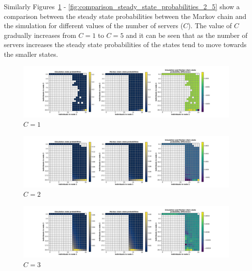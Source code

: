 Similarly Figures~\ref{fig:comparison_steady_state_probabilities_2_1} -
\ref{fig:comparison_steady_state_probabilities_2_5} show a comparison between
the steady state probabilities between the Markov chain and the simulation
for different values of the number of servers (\(C\)).
The value of \(C\) gradually increases from \(C = 1\) to \(C = 5\) and it can
be seen that as the number of servers increases the steady state probabilities
of the states tend to move towards the smaller states.


\begin{figure}[H]
    \includegraphics[width=\textwidth, trim=100 10 100 10, clip]{chapters/03_queueing_model/img/numeric_results_and_timings/steady_state_probabilities_2/main_1.pdf}
    \caption{\(C = 1\)}
    \label{fig:comparison_steady_state_probabilities_2_1}
\end{figure}

\begin{figure}[H]
    \includegraphics[width=\textwidth, trim=100 10 100 10, clip]{chapters/03_queueing_model/img/numeric_results_and_timings/steady_state_probabilities_2/main_2.pdf}
    \caption{\(C = 2\)}
    \label{fig:comparison_steady_state_probabilities_2_2}
\end{figure}

\begin{figure}[H]
    \includegraphics[width=\textwidth, trim=100 10 100 10, clip]{chapters/03_queueing_model/img/numeric_results_and_timings/steady_state_probabilities_2/main_3.pdf}
    \caption{\(C = 3\)}
    \label{fig:comparison_steady_state_probabilities_2_3}
\end{figure}

